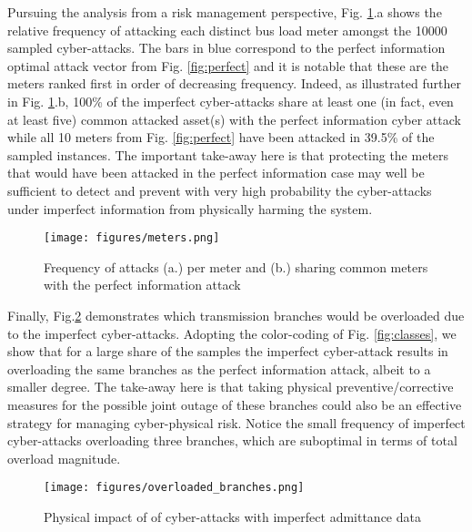 \documentclass{IEEEtran4PSCC}
\begin{document}
Pursuing the analysis from a risk management perspective, Fig. \ref{fig:meters}.a shows the relative frequency of attacking each distinct bus load meter amongst the 10000 sampled cyber-attacks. The bars in blue correspond to the perfect information optimal attack vector from Fig. \ref{fig:perfect} and it is notable that these are the meters ranked first in order of decreasing frequency. Indeed, as illustrated further in Fig. \ref{fig:meters}.b, 100\% of the imperfect cyber-attacks share at least one (in fact, even at least five) common attacked asset(s) with the perfect information cyber attack while all 10 meters from Fig. \ref{fig:perfect} have been attacked in  39.5\% of the sampled instances. The important take-away here is that protecting the meters  {that would have been attacked in the perfect information case} may well be sufficient to detect and prevent  {with very high probability the cyber-attacks under imperfect information} from physically harming the system.
\begin{figure}[h]
\centering
\texttt{[image: figures/meters.png]}
\caption{Frequency of attacks (a.)  per meter and (b.) sharing common meters with the perfect information attack }
\label{fig:meters}
\end{figure}

Finally, Fig.\ref{fig:physical} demonstrates which transmission branches would be overloaded due to the imperfect cyber-attacks. Adopting the color-coding of Fig. \ref{fig:classes}, we show that for a large share of the samples the  imperfect cyber-attack results in overloading the same branches as the perfect information attack, albeit to a smaller degree. The take-away here is that taking physical preventive/corrective measures for the possible joint outage of these branches could also be an effective strategy for managing cyber-physical risk. Notice the small frequency of imperfect cyber-attacks overloading three branches, which are suboptimal in terms of  total overload magnitude.
\begin{figure}[h]
\centering
\texttt{[image: figures/overloaded\_branches.png]}
\caption{Physical impact of of cyber-attacks with imperfect admittance data}
\label{fig:physical}
\end{figure}
\end{document}
